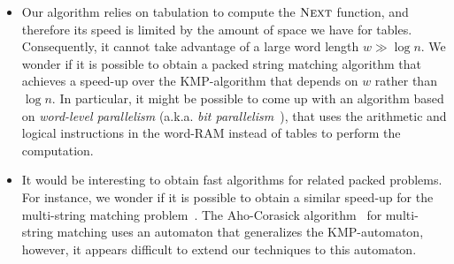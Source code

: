 \documentclass{article}
\newcommand{\Next}{\ensuremath{\textsc{Next}}}
\begin{document}
\begin{itemize}
\item Our algorithm relies on tabulation to compute the $\Next$
  function, and therefore its speed is limited by the amount of space
  we have for tables. Consequently, it cannot take advantage of a
  large word length $w \gg \log n$. We wonder if it is possible to
  obtain a packed string matching algorithm that achieves a speed-up
  over the KMP-algorithm that depends on $w$ rather than $\log n$. In
  particular, it might be possible to come up with an algorithm based
  on \emph{word-level parallelism} (a.k.a. \emph{bit
    parallelism}~\cite{BaezaYates1989}), that uses the arithmetic and
  logical instructions in the word-RAM instead of tables to perform
  the computation.
\item It would be interesting to obtain fast algorithms for related
  packed problems. For instance, we wonder if it is possible to obtain
  a similar speed-up for the multi-string matching
  problem~\cite{AC1975}. The Aho-Corasick algorithm~\cite{AC1975} for
  multi-string matching uses an automaton that generalizes the
  KMP-automaton, however, it appears difficult to extend our
  techniques to this automaton.
\end{itemize}




\end{document}
